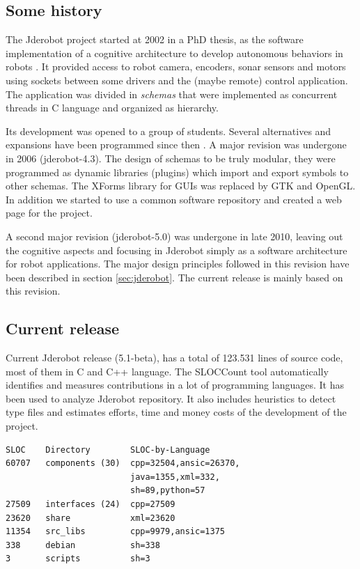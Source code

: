 \documentclass[twocolumn]{svjour3}          %
\begin{document}
\subsection{Some history}

The Jderobot project started at 2002 in a PhD thesis, as the software implementation of a cognitive architecture to develop autonomous behaviors in robots \cite{canas02,canas05e}. It provided access to robot camera, encoders, sonar sensors and motors using sockets between some drivers and the (maybe remote) control application. The application was divided in \textit{schemas} that were implemented as concurrent threads in C language and organized as hierarchy. 

Its development was opened to a group of students. Several alternatives and expansions have been programmed since then \cite{canas07,canas07f}. A major revision was undergone in 2006 (jderobot-4.3). The design of schemas to be truly modular, they were programmed as dynamic libraries (plugins) which import and export symbols to other schemas. The XForms library for GUIs was replaced by GTK and OpenGL. In addition we started to use a common software repository and created a web page for the project. 

A second major revision (jderobot-5.0) was undergone in late 2010, leaving out the cognitive aspects and focusing in Jderobot simply as a software architecture for robot applications. The major design principles followed in this revision have been described in section \ref{sec:jderobot}. The current release is mainly based on this revision.


\subsection{Current release}
Current Jderobot release (5.1-beta), has a total of 123.531 lines of source code, most of them in C and C++ language. The SLOCCount tool automatically identifies and measures contributions in a lot of programming languages. It has been used to analyze Jderobot repository. It also includes heuristics to detect type files and estimates efforts, time and money costs of the development of the project.

\begin{verbatim}
SLOC    Directory        SLOC-by-Language 
60707   components (30)  cpp=32504,ansic=26370,
                         java=1355,xml=332,
                         sh=89,python=57
27509   interfaces (24)  cpp=27509
23620   share            xml=23620
11354   src_libs         cpp=9979,ansic=1375
338     debian           sh=338
3       scripts          sh=3
\end{verbatim}
\end{document}
